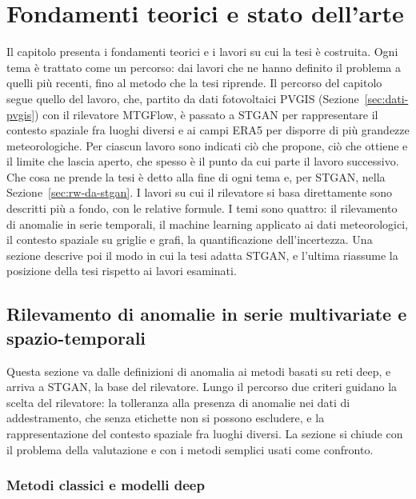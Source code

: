\chapter{Fondamenti teorici e stato dell'arte}
\label{chap:stato-arte}

Il capitolo presenta i fondamenti teorici e i lavori su cui la tesi è costruita. Ogni tema è trattato come un percorso: dai lavori che ne hanno definito il problema a quelli più recenti, fino al metodo che la tesi riprende. Il percorso del capitolo segue quello del lavoro, che, partito da dati fotovoltaici PVGIS (Sezione~\ref{sec:dati-pvgis}) con il rilevatore MTGFlow, è passato a STGAN per rappresentare il contesto spaziale fra luoghi diversi e ai campi ERA5 per disporre di più grandezze meteorologiche. Per ciascun lavoro sono indicati ciò che propone, ciò che ottiene e il limite che lascia aperto, che spesso è il punto da cui parte il lavoro successivo. Che cosa ne prende la tesi è detto alla fine di ogni tema e, per STGAN, nella Sezione~\ref{sec:rw-da-stgan}. I lavori su cui il rilevatore si basa direttamente sono descritti più a fondo, con le relative formule. I temi sono quattro: il rilevamento di anomalie in serie temporali, il machine learning applicato ai dati meteorologici, il contesto spaziale su griglie e grafi, la quantificazione dell'incertezza. Una sezione descrive poi il modo in cui la tesi adatta STGAN, e l'ultima riassume la posizione della tesi rispetto ai lavori esaminati.

\section{Rilevamento di anomalie in serie multivariate e spazio-temporali}
\label{sec:rw-anomalie}

Questa sezione va dalle definizioni di anomalia ai metodi basati su reti deep, e arriva a STGAN, la base del rilevatore. Lungo il percorso due criteri guidano la scelta del rilevatore: la tolleranza alla presenza di anomalie nei dati di addestramento, che senza etichette non si possono escludere, e la rappresentazione del contesto spaziale fra luoghi diversi. La sezione si chiude con il problema della valutazione e con i metodi semplici usati come confronto.

\subsection{Metodi classici e modelli deep}
\label{sec:rw-anomalie-origini}

